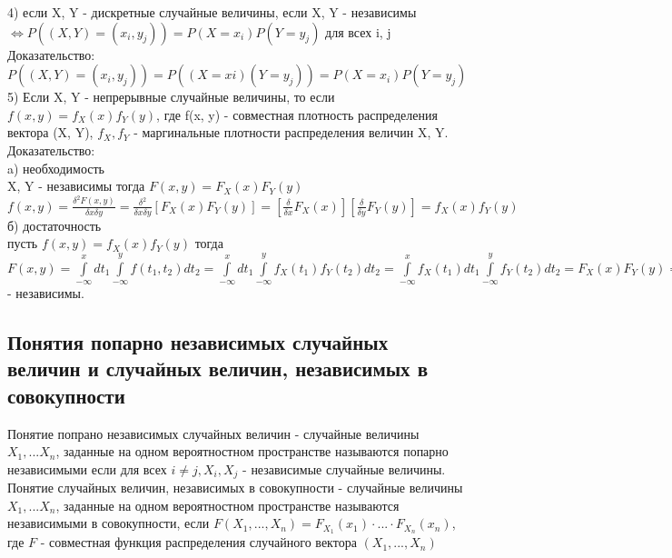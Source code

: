 4) если X, Y - дискретные случайные величины, если X, Y - независимы $\Leftrightarrow P((X, Y) = (x_{i}, y_{j})) = P(X = x_{i})P(Y = y_{j})$ для всех i, j\\
Доказательство:\\
$P((X, Y) = (x_{i}, y_{j})) = P((X = x{i}) (Y = y_{j})) = P(X = x_{i})P(Y = y_{j})$\\

5) Если X, Y - непрерывные случайные величины, то если $f(x, y) = f_{X}(x)f_{Y}(y)$, где f(x, y) - совместная плотность распределения вектора (X, Y), $f_{X}, f_{Y}$ - маргинальные плотности распределения величин X, Y.\\ 
Доказательство:\\
a) необходимость\\
X, Y - независимы тогда $F(x, y) = F_{X}(x)F_{Y}(y)$\\
$f(x, y) = \frac{\delta^{2}F(x, y)}{\delta x \delta y} = \frac{\delta^{2}}{\delta x \delta y}[F_{X}(x)F_{Y}(y)] = [\frac{\delta}{\delta x} F_{X}(x)][\frac{\delta}{\delta y} F_{Y}(y)] = f_{X}(x)f_{Y}(y)$\\
б) достаточность\\
пусть $f(x, y) = f_{X}(x)f_{Y}(y)$ тогда $F(x, y) = \int\limits_{-\infty}^{x} dt_{1} \int\limits_{-\infty}^{y} f(t_{1}, t_{2}) dt_{2} = \int\limits_{-\infty}^{x} dt_{1} \int\limits_{-\infty}^{y} f_{X}(t_{1})f_{Y}(t_{2}) dt_{2} = \int\limits_{-\infty}^{x}  f_{X}(t_{1}) dt_{1} \int\limits_{-\infty}^{y} f_{Y}(t_{2}) dt_{2} = F_{X}(x)F_{Y}(y) \Rightarrow X,Y$ - независимы.

\subsection{Понятия попарно независимых случайных величин и случайных величин, независимых в совокупности}
Понятие попрано независимых случайных величин - случайные величины $X_{1}, ... X_{n}$, заданные на одном вероятностном пространстве называются попарно независимыми если для всех $i \neq j, X_{i}, X_{j}$ - независимые случайные величины.\\

Понятие случайных величин, независимых в совокупности - случайные величины $X_{1}, ... X_{n}$, заданные на одном вероятностном пространстве называются независимыми в совокупности, если $F(X_{1}, ..., X_{n}) = F_{X_{1}}(x_{1}) \cdot ... \cdot F_{X_{n}}(x_{n})$, где $F$ - совместная функция распределения случайного вектора $(X_{1}, ..., X_{n})$\\

